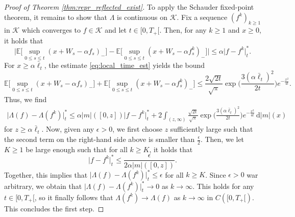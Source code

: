 \documentclass[11pt, a4paper]{article}
\theoremstyle{plain}
\theoremstyle{definition}
\theoremstyle{remark}
\numberwithin{equation}{section}
\newcommand{\ev}{\mathbb{E}}
\renewcommand{\d}{\mathrm{d}}
\renewcommand{\cal}[1]{\mathcal{#1}}
\begin{document}
\begin{proof}[Proof of Theorem \ref{thm:repr_reflected_exist}]
To apply the Schauder fixed-point theorem, it remains to show that $\Lambda$ is continuous on $\cal{K}$. Fix a sequence $(f^k)_{k \geq 1}$ in $\cal{K}$ which converges to $f \in \cal{K}$ and let $t \in [0, T_+[$. Then, for any $k \geq 1$ and $x \geq 0$, it holds that
\begin{equation*}
     \biggl\lvert \ev\biggl[\sup_{0 \leq s \leq t} (x + W_s - \alpha f_s)_-\biggr] - \ev\biggl[\sup_{0 \leq s \leq t} (x + W_s - \alpha f^k_s)_-\biggr]\biggr\rvert \leq \alpha \lvert f - f^k\rvert^{\ast}_t.
\end{equation*}
For $x \geq \alpha \bar{\ell}_t$, the estimate \eqref{eq:local_time_est} yields the bound
\begin{equation*}
   \ev\biggl[\sup_{0 \leq s \leq t} (x + W_s - \alpha f_s)_-\biggr] + \ev\biggl[\sup_{0 \leq s \leq t} (x + W_s - \alpha f^k_s)_-\biggr] \leq \frac{2 \sqrt{2 t}}{\sqrt{\pi}} \exp\biggl(\frac{3 (\alpha \bar{\ell}_t)^2}{2t}\biggr) e^{-\frac{x^2}{4t}}.
\end{equation*}
Thus, we find
\begin{align*}
    \bigl\lvert \Lambda(f) - \Lambda(f^k)\bigr\rvert^{\ast}_t \leq \alpha \lvert m\rvert([0, z]) \lvert f - f^k\rvert^{\ast}_t + 2 \int_{(z, \infty)} \frac{\sqrt{2 t}}{\sqrt{\pi}} \exp\biggl(\frac{3 (\alpha \bar{\ell}_t)^2}{2t}\biggr) e^{-\frac{x^2}{4t}} \, \d \lvert m\rvert(x)
\end{align*}
for $z \geq \alpha \bar{\ell}_t$. Now, given any $\epsilon > 0$, we first choose $z$ sufficiently large such that the second term on the right-hand side above is smaller than $\frac{\epsilon}{2}$. Then, we let $K \geq 1$ be large enough such that for all $k \geq K$, it holds that 
\begin{equation*}
    \lvert f - f^k\rvert^{\ast}_t \leq \frac{\epsilon}{2 \alpha \lvert m\rvert([0, z])}.
\end{equation*}
Together, this implies that $\lvert \Lambda(f) - \Lambda(f^k)\rvert^{\ast}_t \leq \epsilon$ for all $k \geq K$. Since $\epsilon > 0$ war arbitrary, we obtain that $\lvert \Lambda(f) - \Lambda(f^k)\rvert^{\ast}_t \to 0$ as $k \to \infty$. This holds for any $t \in [0, T_+[$, so it finally follows that $\Lambda(f^k) \to \Lambda(f)$ as $k \to \infty$ in $C([0, T_+[)$. This concludes the first step.


\end{proof}
\end{document}
